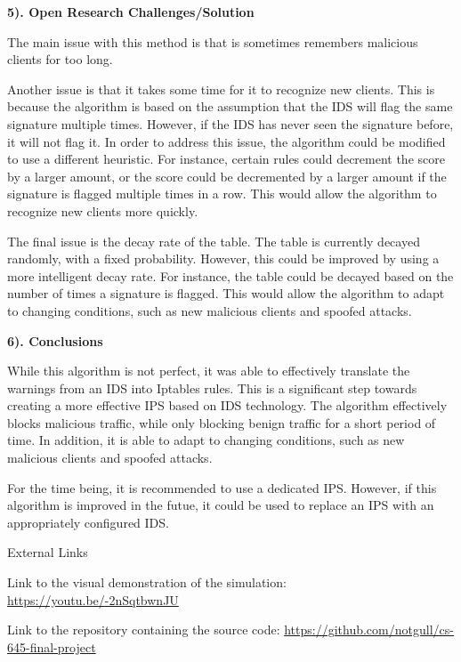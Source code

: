 \documentclass[12pt]{article}
\begin{document}
\begin{flushleft}
\begin{multicols}{2}
\textbf{5). Open Research Challenges/Solution}

The main issue with this method is that is sometimes remembers malicious clients for too long.

Another issue is that it takes some time for it to recognize new clients. This is because the algorithm is based on the assumption that the IDS will flag the same signature multiple times. However, if the IDS has never seen the signature before, it will not flag it. In order to address this issue, the algorithm could be modified to use a different heuristic. For instance, certain rules could decrement the score by a larger amount, or the score could be decremented by a larger amount if the signature is flagged multiple times in a row. This would allow the algorithm to recognize new clients more quickly.

The final issue is the decay rate of the table. The table is currently decayed randomly, with a fixed probability. However, this could be improved by using a more intelligent decay rate. For instance, the table could be decayed based on the number of times a signature is flagged. This would allow the algorithm to adapt to changing conditions, such as new malicious clients and spoofed attacks.

\textbf{6). Conclusions}

While this algorithm is not perfect, it was able to effectively translate the warnings from an IDS into Iptables rules. This is a significant step towards creating a more effective IPS based on IDS technology. The algorithm effectively blocks malicious traffic, while only blocking benign traffic for a short period of time. In addition, it is able to adapt to changing conditions, such as new malicious clients and spoofed attacks.

For the time being, it is recommended to use a dedicated IPS. However, if this algorithm is improved in the futue, it could be used to replace an IPS with an appropriately configured IDS.

\end{multicols}

\newpage

\begin{center}
External Links
\end{center}

Link to the visual demonstration of the simulation: \href{https://youtu.be/-2nSqtbwnJU}{https://youtu.be/-2nSqtbwnJU}

Link to the repository containing the source code: \href{https://github.com/notgull/cs-645-final-project}{https://github.com/notgull/cs-645-final-project}


\end{flushleft}
\end{document}
